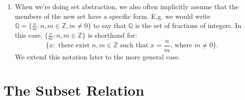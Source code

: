 \begin{enumerate}[{\thesection}.1]
	\item When we're doing set abstraction, we also often implicitly assume that the members of the new set have a specific form. E.g. we would write $\mathbb{Q}=\{\frac{n}{m}:n,m\in \mathbb{Z}, m\neq 0\}$ to say that $\mathbb{Q}$ is the set of fractions of integers. In this case, $\{\frac{n}{m}:n,m\in \mathbb{Z}\}$ is shorthand for: \[\{x: \text{ there exist }n,m\in \mathbb{Z}\text{ such that }x=\frac{n}{m}\text{, where }m\neq 0 \}.\] We extend this notation later to the more general case.
		
\end{enumerate}

\section{The Subset Relation}


